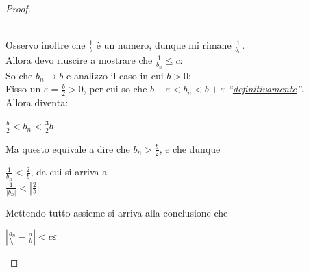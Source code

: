 \documentclass{article}
\theoremstyle{definition}
\newcommand{\virgolette}[1]{``#1''}
\begin{document}
\begin{proof}
\begin{itemize}
\\
Osservo inoltre che $\frac{1}{b}$ è un numero, dunque mi rimane $\frac{1}{b_n}$.
\\
Allora devo riuscire a mostrare che $\frac{1}{b_n}\leqslant c$:
\\
So che $b_n \longrightarrow b$ e analizzo il caso in cui $b>0$:
\\
Fisso un $\varepsilon=\frac{b}{2}>0$, per cui so che $b-\varepsilon < b_n < b+\varepsilon$ \textit{\virgolette{\underline{definitivamente}}}.
\\
Allora diventa:
\begin{center}
    $\frac{b}{2}<b_n<\frac{3}{2}b$
\end{center}
Ma questo equivale a dire che $b_n>\frac{b}{2}$, e che dunque
\begin{center}
    $\frac{1}{b_n}<\frac{2}{b}$, da cui si arriva a 
    \\
    $\frac{1}{|b_n|}<|\frac{2}{b}|$
\end{center}
Mettendo tutto assieme si arriva alla conclusione che
\begin{center}
    $|\frac{a_n}{b_n}-\frac{a}{b}|< c\varepsilon$
\end{center}
\end{itemize}
\end{proof}
\end{document}

